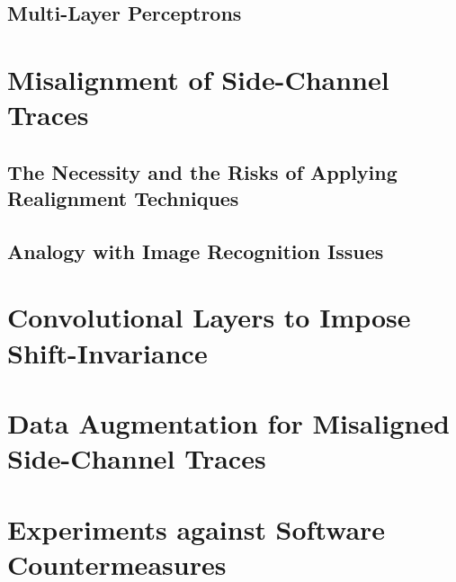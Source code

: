 \subsection{Multi-Layer Perceptrons}


\section{Misalignment of Side-Channel Traces}

\subsection{The Necessity and the Risks of Applying Realignment Techniques}
\subsection{Analogy with Image Recognition Issues}


\section{Convolutional Layers to Impose Shift-Invariance}


\section{Data Augmentation for Misaligned Side-Channel Traces}

\section{Experiments against Software Countermeasures}



